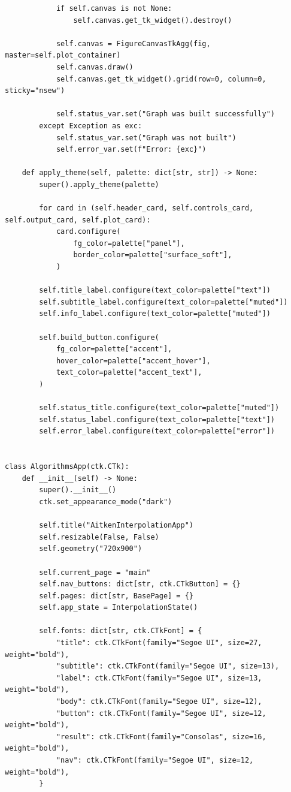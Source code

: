 \documentclass[12pt,a4paper]{article}
\begin{document}
\begin{verbatim}
            if self.canvas is not None:
                self.canvas.get_tk_widget().destroy()

            self.canvas = FigureCanvasTkAgg(fig, master=self.plot_container)
            self.canvas.draw()
            self.canvas.get_tk_widget().grid(row=0, column=0, sticky="nsew")

            self.status_var.set("Graph was built successfully")
        except Exception as exc:
            self.status_var.set("Graph was not built")
            self.error_var.set(f"Error: {exc}")

    def apply_theme(self, palette: dict[str, str]) -> None:
        super().apply_theme(palette)

        for card in (self.header_card, self.controls_card, self.output_card, self.plot_card):
            card.configure(
                fg_color=palette["panel"],
                border_color=palette["surface_soft"],
            )

        self.title_label.configure(text_color=palette["text"])
        self.subtitle_label.configure(text_color=palette["muted"])
        self.info_label.configure(text_color=palette["muted"])

        self.build_button.configure(
            fg_color=palette["accent"],
            hover_color=palette["accent_hover"],
            text_color=palette["accent_text"],
        )

        self.status_title.configure(text_color=palette["muted"])
        self.status_label.configure(text_color=palette["text"])
        self.error_label.configure(text_color=palette["error"])


class AlgorithmsApp(ctk.CTk):
    def __init__(self) -> None:
        super().__init__()
        ctk.set_appearance_mode("dark")

        self.title("AitkenInterpolationApp")
        self.resizable(False, False)
        self.geometry("720x900")

        self.current_page = "main"
        self.nav_buttons: dict[str, ctk.CTkButton] = {}
        self.pages: dict[str, BasePage] = {}
        self.app_state = InterpolationState()

        self.fonts: dict[str, ctk.CTkFont] = {
            "title": ctk.CTkFont(family="Segoe UI", size=27, weight="bold"),
            "subtitle": ctk.CTkFont(family="Segoe UI", size=13),
            "label": ctk.CTkFont(family="Segoe UI", size=13, weight="bold"),
            "body": ctk.CTkFont(family="Segoe UI", size=12),
            "button": ctk.CTkFont(family="Segoe UI", size=12, weight="bold"),
            "result": ctk.CTkFont(family="Consolas", size=16, weight="bold"),
            "nav": ctk.CTkFont(family="Segoe UI", size=12, weight="bold"),
        }


\end{verbatim}
\end{document}
